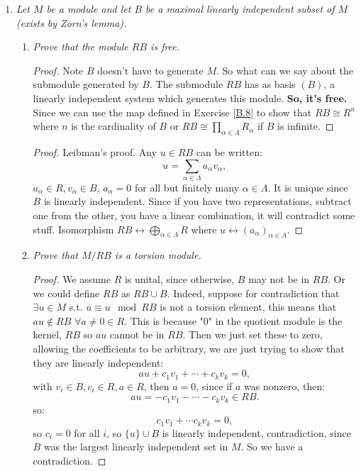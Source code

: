 \documentclass[12pt]{amsbook}
\theoremstyle{plain}
\numberwithin{section}{chapter}
\numberwithin{equation}{chapter}
\theoremstyle{definition}
\theoremstyle{remark}
\begin{document}
\begin{enumerate}[label=\arabic*.]
\item \textit{Let $M$ be a module and let $B$ be a maximal linearly independent subset of $M$ (exists by Zorn's lemma). }

\begin{enumerate}
\item \textit{Prove that the module $RB$ is free. }

\begin{proof}
Note $B$ doesn't have to generate $M$. So what can we say about the submodule generated by $B$. The submodule $RB$ has as basis $(B)$, a linearly independent system which generates this module. \textbf{So, it's free.} Since we can use the map defined in Exercise \ref{B.8} to show that $RB \cong R^n$ where $n$ is the cardinality of $B$ or $RB \cong \prod_{\alpha \in \Lambda} R_\alpha$ if $B$ is infinite. 
\end{proof}

\begin{proof}
Leibman's proof. Any $u \in RB$ can be written:
$$
u = \sum_{\alpha \in \Lambda} a_\alpha v_\alpha,
$$
$a_\alpha \in R,v_\alpha \in B$, $a_\alpha = 0$ for all but finitely many $\alpha \in \Lambda$. It is unique since $B$ is linearly independent. Since if you have two representations, subtract one from the other, you have a linear combination, it will contradict some stuff. Isomorphism $RB \leftrightarrow \bigoplus_{\alpha \in \Lambda} R$ where $u \leftrightarrow (a_\alpha)_{\alpha \in \Lambda}$. 
\end{proof}

\item \textit{Prove that $M/RB$ is a torsion module. }

\begin{proof}
We assume $R$ is unital, since otherwise, $B$ may not be in $RB$. Or we could define $RB$ as $RB \cup B$. 
Indeed, suppose for contradiction that $\exists u \in M$ s.t. $\overline{u} \equiv u \mod RB$ is not a torsion element, this means that $au \notin RB$ $\forall a \neq 0 \in R$. This is because "0" in the quotient module is the kernel, $RB$ so $au$ cannot be in $RB$. Then we just set these to zero, allowing the coefficients to be arbitrary, we are just trying to show that they are linearly independent:
$$
au + c_1v_1 + \cdots + c_kv_k = 0,
$$
 with $v_i \in B, c_i \in R, a \in R$, then $a = 0$, since if $a$ was nonzero, then:
 $$
 au = -c_1v_1 - \cdots - c_kv_k \in RB.
 $$ 
 so:
 $$
 c_1v_1 + \cdots c_kv_k = 0,
 $$
 so $c_i = 0$ for all $i$, so $\{u\}\cup B$ is linearly independent, contradiction, since $B$ was the largest linearly independent set in $M$. So we have a contradiction. 
 

\end{proof}
\end{enumerate}
\end{enumerate}
\end{document}
